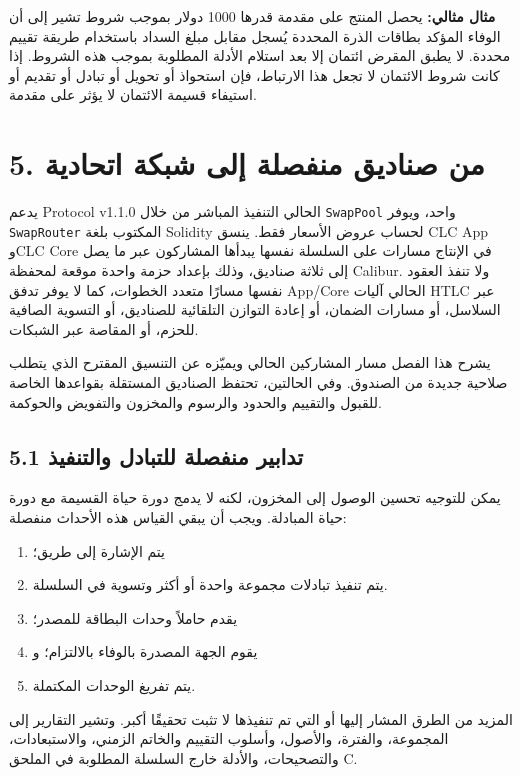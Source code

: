 \documentclass[11pt]{article}
\begin{document}
\textbf{مثال مثالي:} يحصل المنتج على مقدمة قدرها 1000 دولار بموجب شروط تشير إلى أن الوفاء المؤكد بطاقات الذرة المحددة يُسجل مقابل مبلغ السداد باستخدام طريقة تقييم محددة. لا يطبق المقرض ائتمان إلا بعد استلام الأدلة المطلوبة بموجب هذه الشروط. إذا كانت شروط الائتمان لا تجعل هذا الارتباط، فإن استحواذ أو تحويل أو تبادل أو تقديم أو استيفاء قسيمة الائتمان لا يؤثر على مقدمة.


\section*{5. من صناديق منفصلة إلى شبكة اتحادية}

يدعم Protocol v1.1.0 الحالي التنفيذ المباشر من خلال \texttt{SwapPool} واحد، ويوفر \texttt{SwapRouter} المكتوب بلغة Solidity لحساب عروض الأسعار فقط. ينسق CLC App وCLC Core في الإنتاج مسارات على السلسلة نفسها يبدأها المشاركون عبر ما يصل إلى ثلاثة صناديق، وذلك بإعداد حزمة واحدة موقعة لمحفظة Calibur. ولا تنفذ العقود نفسها مسارًا متعدد الخطوات، كما لا يوفر تدفق App/Core الحالي آليات HTLC عبر السلاسل، أو مسارات الضمان، أو إعادة التوازن التلقائية للصناديق، أو التسوية الصافية للحزم، أو المقاصة عبر الشبكات.

يشرح هذا الفصل مسار المشاركين الحالي ويميّزه عن التنسيق المقترح الذي يتطلب صلاحية جديدة من الصندوق. وفي الحالتين، تحتفظ الصناديق المستقلة بقواعدها الخاصة للقبول والتقييم والحدود والرسوم والمخزون والتفويض والحوكمة.

\subsection*{5.1 تدابير منفصلة للتبادل والتنفيذ}

يمكن للتوجيه تحسين الوصول إلى المخزون، لكنه لا يدمج دورة حياة القسيمة مع دورة حياة المبادلة. ويجب أن يبقي القياس هذه الأحداث منفصلة:

\begin{enumerate}[leftmargin=*]
\item يتم الإشارة إلى طريق؛
\item يتم تنفيذ تبادلات مجموعة واحدة أو أكثر وتسوية في السلسلة.
\item يقدم حاملاً وحدات البطاقة للمصدر؛
\item يقوم الجهة المصدرة بالوفاء بالالتزام؛ و
\item يتم تفريغ الوحدات المكتملة.
\end{enumerate}
المزيد من الطرق المشار إليها أو التي تم تنفيذها لا تثبت تحقيقًا أكبر. وتشير التقارير إلى المجموعة، والفترة، والأصول، وأسلوب التقييم والخاتم الزمني، والاستبعادات، والتصحيحات، والأدلة خارج السلسلة المطلوبة في الملحق C.
\end{document}
